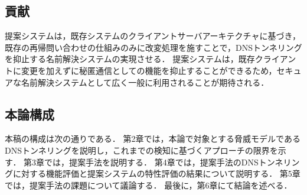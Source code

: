 \subsection{貢献}
提案システムは，既存システムのクライアントサーバアーキテクチャに基づき，既存の再帰問い合わせの仕組みのみに改変処理を施すことで，DNSトンネリングを抑止する名前解決システムの実現させる．
提案システムは，既存クライアントに変更を加えずに秘匿通信としての機能を抑止することができるため，セキュアな名前解決システムとして広く一般に利用されることが期待される．





\subsection{本論構成}
本稿の構成は次の通りである．
第2章では，本論で対象とする脅威モデルであるDNSトンネリングを説明し，これまでの検知に基づくアプローチの限界を示す．
第3章では，提案手法を説明する．
第4章では，提案手法のDNSトンネリングに対する機能評価と提案システムの特性評価の結果について説明する．
第5章では，提案手法の課題について議論する．
最後に，第6章にて結論を述べる．
